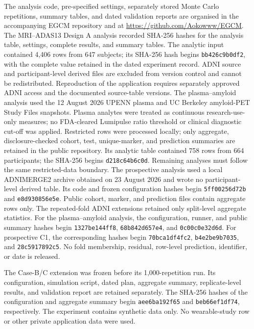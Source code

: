 \documentclass[11pt]{article}
\theoremstyle{definition}
\begin{document}
The analysis code, pre-specified settings, separately stored Monte Carlo repetitions,
summary tables, and dated validation reports are organised in the accompanying EGCM
repository \cite{huo2026} and at \url{https://github.com/Aokowww/EGCM}. The MRI--ADAS13
Design A analysis recorded SHA-256 hashes for the
analysis table, settings, complete results, and summary tables. The analytic input
contained 4,406 rows from 647 subjects; its SHA-256 hash begins
\texttt{bb426c9b0df2}, with the complete value retained in the dated experiment record.
ADNI source and participant-level derived files are excluded from version control and cannot
be redistributed. Reproduction of the application requires separately approved ADNI access
and the documented source-table versions. The plasma--amyloid analysis used the 12 August
2026 UPENN plasma and UC Berkeley amyloid-PET Study Files snapshots. Plasma analytes were
treated as continuous research-use-only measures; no FDA-cleared Lumipulse ratio threshold
or clinical diagnostic cut-off was applied. Restricted rows were
processed locally; only aggregate, disclosure-checked cohort, test, unique-marker, and
prediction summaries are retained in the public repository. Its analytic table contained
758 rows from 664 participants; the SHA-256 begins \texttt{d218c64b6c0d}. Remaining analyses
must follow the same restricted-data boundary. The prospective analysis used a local
ADNIMERGE2 archive obtained on 23 August 2026 and wrote no participant-level derived table.
Its code and frozen configuration hashes begin \texttt{5ff00256d72b} and
\texttt{e8d930856e5e}. Public cohort, marker, and prediction files contain aggregate rows only.
The repeated-fold ADNI extensions retained only split-level aggregate statistics. For the
plasma--amyloid analysis, the configuration, runner, and public summary hashes begin
\texttt{1327be144ff8}, \texttt{68b842d657e4}, and \texttt{0c00c0e32d6d}. For prospective
C1, the corresponding hashes begin \texttt{70bca1df4fc2}, \texttt{b4e2be9b7035}, and
\texttt{28c5917892c5}. No fold membership, residual, row-level prediction, identifier, or date
is released.

The Case-B/C extension was frozen before its 1,000-repetition run. Its configuration,
simulation script, dated plan, aggregate summary, replicate-level results, and validation
report are retained separately. The SHA-256 hashes of the configuration and aggregate
summary begin \texttt{aee6ba192f65} and \texttt{beb66ef1df74}, respectively. The experiment
contains synthetic data only. No wearable-study row or other private application data were
used.
\end{document}
